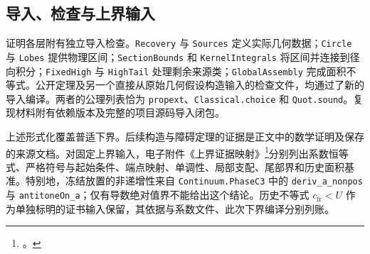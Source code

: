 \subsection{导入、检查与上界输入}
证明各层附有独立导入检查。\texttt{Recovery} 与 \texttt{Sources} 定义实际几何数据；\texttt{Circle} 与 \texttt{Lobes} 提供物理区间；\texttt{SectionBounds} 和 \texttt{KernelIntegrals} 将区间并连接到径向积分；\texttt{FixedHigh} 与 \texttt{HighTail} 处理剩余来源类；\texttt{GlobalAssembly} 完成面积不等式。公开定理及另一个直接从原始几何假设构造输入的检查文件，均通过了新的导入编译。两者的公理列表恰为 \texttt{propext}、\texttt{Classical.choice} 和 \texttt{Quot.sound}。复现材料附有依赖版本及完整的项目源码导入闭包。

上述形式化覆盖普适下界。后续构造与障碍定理的证据是正文中的数学证明及保存的来源文档。对固定上界输入，电子附件《上界证据映射》\footnote{\texttt{}。}分别列出系数恒等式、严格符号与起始条件、端点映射、单调性、局部支配、尾部界和历史面积基准。特别地，冻结放置的非递增性来自 \texttt{Continuum.PhaseC3} 中的 \texttt{deriv\_a\_nonpos} 与 \texttt{antitoneOn\_a}；仅有导数绝对值界不能给出这个结论。历史不等式 $c_{\mathrm{fr}}<U$ 作为单独标明的证书输入保留，其依据与系数文件、此次下界编译分别列账。
